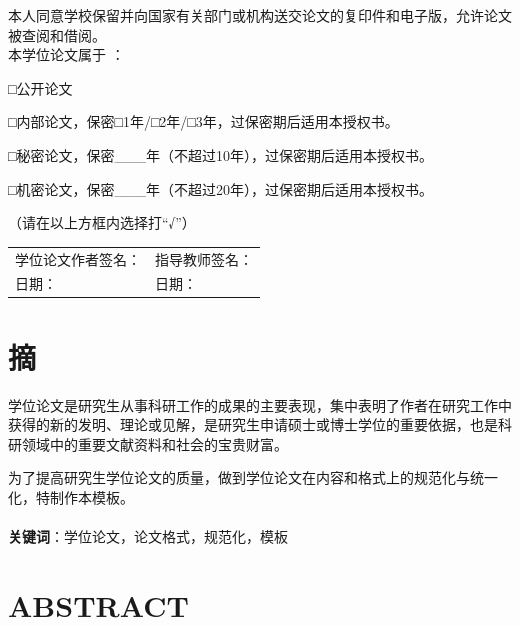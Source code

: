 \documentclass[UTF8,a4paper,12pt]{ctexart}
\numberwithin{equation}{section}
\begin{document}
本人同意学校保留并向国家有关部门或机构送交论文的复印件和电子版，允许论文被查阅和借阅。\\
本学位论文属于 ：\par
□公开论文\par
□内部论文，保密□1年/□2年/□3年，过保密期后适用本授权书。\par
□秘密论文，保密\_\_\_年（不超过10年），过保密期后适用本授权书。\par
□机密论文，保密\_\_\_年（不超过20年），过保密期后适用本授权书。\par
（请在以上方框内选择打“√”）\\

\begin{flushright}
\begin{tabular}{l l}
学位论文作者签名：\hspace{10mm}\qquad \hspace{100mm}&指导教师签名：\qquad\\
日期： &日期：\\
\end{tabular}
\end{flushright}

\newpage
{}

\section*{摘}

\hspace{8mm}学位论文是研究生从事科研工作的成果的主要表现，集中表明了作者在研究工作中获得的新的发明、理论或见解，是研究生申请硕士或博士学位的重要依据，也是科研领域中的重要文献资料和社会的宝贵财富。\par 
为了提高研究生学位论文的质量，做到学位论文在内容和格式上的规范化与统一化，特制作本模板。\\
~\\
\textbf{关键词}：学位论文，论文格式，规范化，模板\\

\newpage
{}
\section*{ABSTRACT}
\end{document}
